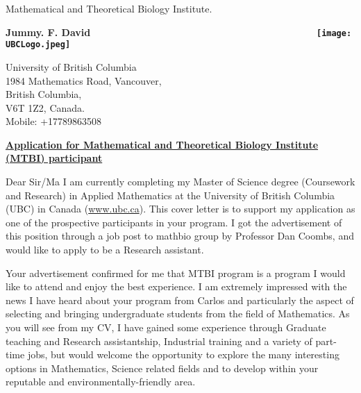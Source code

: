 \documentclass{letter} %
\begin{document}
\signature{David Jummy Funke \href{mailto: jummy30@math.ubc.ca}{jummy30@math.ubc.ca} }           %
\longindentation=0pt                       %
\let\raggedleft\raggedright                %
 
\begin{letter}{Mathematical and Theoretical Biology Institute.}

\begin{flushleft}
{\large\bf Jummy. F. David $\qquad \qquad \qquad \qquad \qquad \qquad \qquad \qquad \qquad \qquad \qquad \  \ \  \ ${\texttt{[image: UBCLogo.jpeg]}}}
\end{flushleft}

\begin{flushright}
\hfill University of British Columbia\\
\hfill 1984 Mathematics Road, Vancouver,\\
\hfill British Columbia,\\
\hfill V6T 1Z2, Canada.\\
\hfill Mobile: +17789863508
\end{flushright} 
\vfill %
 
\opening{} 

\begin{center}
{\bf{\underline{Application for Mathematical and Theoretical Biology Institute (MTBI) participant}}}
\end{center}
Dear Sir/Ma
\noindent I am currently completing my Master of Science degree (Coursework and Research) in Applied Mathematics at the University of British Columbia (UBC) in Canada (\href{http://www.ubc.ca}{www.ubc.ca}). This cover letter is to support my application as one of the prospective participants in your program. I got the advertisement of this position through a job post to mathbio group by Professor Dan Coombs, and would like to apply to be a Research assistant.

\noindent Your advertisement confirmed for me that MTBI program is a program I would like to attend and enjoy the best experience. I am extremely impressed with the news I have heard about your program from Carlos  and particularly  the aspect of selecting and bringing undergraduate students from the field of Mathematics. As you will see from my CV, I have gained some experience through Graduate teaching and Research assistantship, Industrial training and a variety of part-time jobs, but would welcome the opportunity to explore the many interesting options in Mathematics, Science related fields and to develop within your reputable and environmentally-friendly area.


\end{letter}
\end{document}
